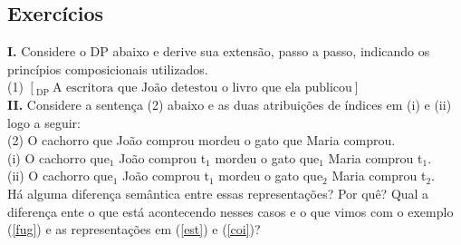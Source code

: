 \begin{tcolorbox}[parbox=false,boxrule=0pt,sharp corners,breakable]

\section*{Exercícios}

\n\textbf{I.} Considere o DP abaixo e derive sua extensão, passo a passo, indicando os princípios composicionais
utilizados.\\


\n (1)  $[_{\text{DP}}\ \text{A escritora que João detestou o livro que ela publicou}]$ \\

\n\textbf{II.} Considere a sentença (2) abaixo e as duas atribuições de índices em (i) e (ii) logo a seguir:\\

\n (2) O cachorro que João comprou mordeu o gato que Maria comprou.\\

\n (i) O cachorro que$_{1}$ João comprou t$_{1}$ mordeu o gato que$_{1}$ Maria comprou t$_{1}$.\\

\n (ii) O cachorro que$_{1}$ João comprou t$_{1}$ mordeu o gato que$_{2}$ Maria comprou t$_{2}$.\\

\n Há alguma diferença semântica entre essas representações? Por quê? Qual a diferença ente o que está acontecendo nesses casos e o que vimos com o exemplo (\ref{fug}) e as representações em (\ref{est}) e (\ref{coi})?


\end{tcolorbox}













